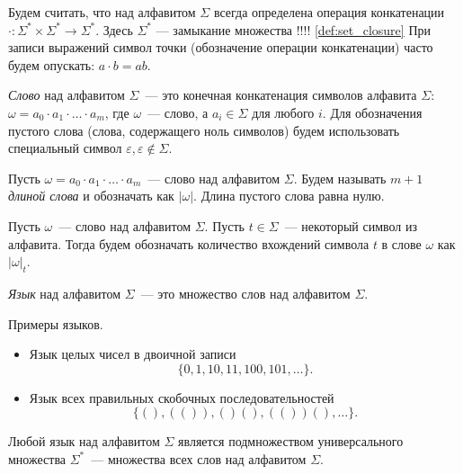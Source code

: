 Будем считать, что над алфавитом $\Sigma$ всегда определена операция конкатенации $\cdot: \Sigma^* \times \Sigma^* \to \Sigma^*$.
Здесь $\Sigma^*$ --- замыкание множества !!!! \ref{def:set_closure}
При записи выражений символ точки (обозначение операции конкатенации) часто будем опускать: $a \cdot b = ab$.

\begin{definition}[Слово]
    \emph{Слово} над алфавитом $\Sigma$~--- это конечная конкатенация символов алфавита $\Sigma$: $\omega = a_0 \cdot a_1 \cdot \dots \cdot a_m$, где $\omega$~--- слово, а $a_i \in \Sigma$ для любого $i$.
    Для обозначения пустого слова (слова, содержащего ноль символов) будем использовать специальный символ $\varepsilon, \varepsilon \notin \Sigma$.
\end{definition}

\begin{definition}
    Пусть $\omega = a_0 \cdot a_1 \cdot \dots \cdot a_m$~--- слово над алфавитом $\Sigma$.
    Будем называть $m + 1$ \emph{длиной слова} и обозначать как $|\omega|$.
    Длина пустого слова равна нулю.
\end{definition}

\begin{definition}
    Пусть $\omega$~--- слово над алфавитом $\Sigma$. Пусть $t \in \Sigma$~--- некоторый символ из алфавита.
    Тогда будем обозначать количество вхождений символа $t$ в слове $\omega$ как $|\omega|_t$.
\end{definition}

\begin{definition}[Язык]
    \emph{Язык} над алфавитом $\Sigma$~--- это множество слов над алфавитом $\Sigma$.
\end{definition}

\begin{example}
    Примеры языков.

    \begin{itemize}
        \item Язык целых чисел в двоичной записи
              \[\{0, 1, 10, 11, 100, 101, \dots\}.\]
        \item Язык всех правильных скобочных последовательностей
              \[\{(), (()), ()(), (())(), \dots\}.\]
    \end{itemize}
\end{example}

Любой язык над алфавитом $\Sigma$ является подмножеством универсального множества $\Sigma^*$~--- множества всех слов над алфавитом $\Sigma$.

